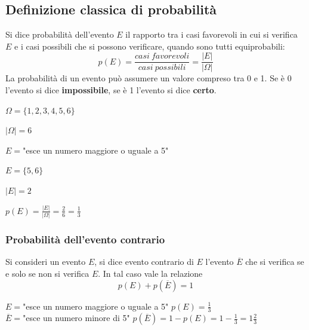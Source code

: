 \documentclass{article}     %
\begin{document}
        \subsection{Definizione classica di probabilità}
        \begin{boxdef}
            Si dice probabilità dell'evento $E$ il rapporto tra i casi favorevoli in cui si verifica $E$ e i casi possibili che si possono verificare, quando sono tutti equiprobabili:
        \[p(E)=\frac{casi~favorevoli}{casi~possibili}=\frac{|E|}{|\Omega|}\]
        La probabilità di un evento può assumere un valore compreso tra 0 e 1. Se è 0 l'evento si dice \textbf{impossibile}, se è 1 l'evento si dice \textbf{certo}. 
        \end{boxdef}
        \begin{ex}


        $\Omega=\{1,2,3,4,5,6\}$

        $|\Omega|=6$

        $E=$"esce un numero maggiore o uguale a 5"

        $E=\{5,6\}$

        $|E|=2$

        $p(E)=\frac{|E|}{|\Omega|}=\frac{2}{6}=\frac{1}{3}$
    \end{ex} 

        \subsubsection{Probabilità dell'evento contrario}
            Si consideri un evento $E$, si dice evento contrario di $E$ l'evento $\overline{E}$ che si verifica se e solo se non si verifica $E$.
            In tal caso vale la relazione \[p(E)+p(\overline{E})=1\]
            \begin{ex}
                $E=$"esce un numero maggiore o uguale a 5" \qquad $p(E)=\frac{1}{3}$ \\
                $\overline{E}=$"esce un numero minore di 5" \qquad $p(\overline{E})=1-p(E)=1-\frac{1}{3}=1\frac{2}{3}$
            \end{ex}
            
\end{document}
